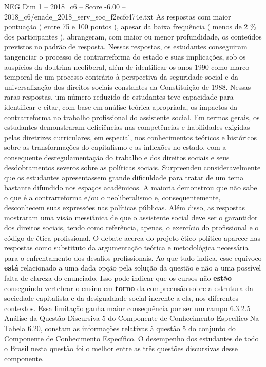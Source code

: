\begin{textsample}{NEG Dim 1 – 2018\_c6 – Score -6.00 – 2018\_c6/enade\_2018\_serv\_soc\_f2ecfc474e.txt}
As respostas com maior pontuação ( entre 75 e 100 pontos ), apesar da baixa frequência ( menos de 2 \% dos participantes ), abrangeram, com maior ou menor profundidade, os conteúdos previstos no padrão de resposta.
Nessas respostas, os estudantes conseguiram tangenciar o processo de contrarreforma do estado e suas implicações, sob os auspícios da doutrina neoliberal, além de identificar os anos 1990 como marco temporal de um processo contrário à perspectiva da seguridade social e da universalização dos direitos sociais constantes da Constituição de 1988.
Nessas raras respostas, um número reduzido de estudantes teve capacidade para identificar e citar, com base em análise teórica apropriada, os impactos da contrarreforma no trabalho profissional do assistente social.
Em termos gerais, os estudantes demonstraram deficiências nas competências e habilidades exigidas pelas diretrizes curriculares, em especial, nos conhecimentos teóricos e históricos sobre as transformações do capitalismo e as inflexões no estado, com a consequente desregulamentação do trabalho e dos direitos sociais e seus desdobramentos severos sobre as políticas sociais.
Surpreendeu consideravelmente que os estudantes apresentassem grande dificuldade para tratar de um tema bastante difundido nos espaços acadêmicos.
A maioria demonstrou que não sabe o que é a contrarreforma e/ou o neoliberalismo e, consequentemente, desconhecem suas expressões nas políticas públicas.
Além disso, as respostas mostraram uma visão messiânica de que o assistente social deve ser o garantidor dos direitos sociais, tendo como referência, apenas, o exercício do profissional e o código de ética profissional.
O debate acerca do projeto ético político aparece nas respostas como substituto da argumentação teórica e metodológica necessária para o enfrentamento dos desafios profissionais.
Ao que tudo indica, esse equívoco \textbf{está} relacionado a uma dada opção pela solução da questão e não a uma possível falta de clareza do enunciado.
Isso pode indicar que os cursos não \textbf{estão} conseguindo vertebrar o ensino em \textbf{torno} da compreensão sobre a estrutura da sociedade capitalista e da desigualdade social inerente a ela, nos diferentes contextos.
Essa limitação ganha maior consequência por ser um campo 6.3.2.5 Análise da Questão Discursiva 5 do Componente de Conhecimento Específico Na Tabela 6.20, constam as informações relativas à questão 5 do conjunto do Componente de Conhecimento Específico.
O desempenho dos estudantes de todo o Brasil nesta questão foi o melhor entre as três questões discursivas desse componente.

\end{textsample}
